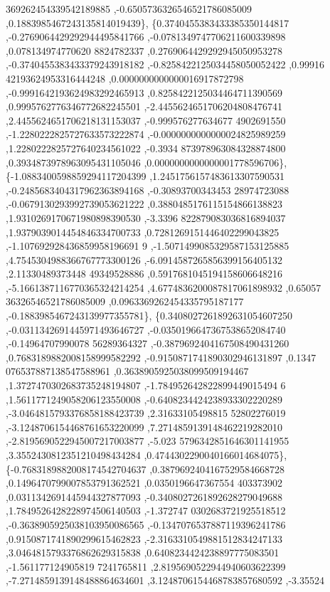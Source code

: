 \begin{DoxyCode}
      369262454339542189885 ,-0.6505736326546521786085009 ,0.1883985467243135814019439\},
\{0.3740455383433385350144817 ,-0.2769064429292944495841766 ,-0.0781349747706211600339898 ,0.078134974770620
      8824782337 ,0.2769064429292945050953278 ,-0.3740455383433379243918182 ,-0.8258422125034458050052422 ,0.99916
      42193624953316444248 ,0.0000000000000016917872798 ,-0.9991642193624983292465913 ,0.8258422125034464711390569
       ,0.9995762776346772682245501 ,-2.4455624651706204808476741 ,2.4455624651706218131153037 ,-0.999576277634677
      4902691550 ,-1.2280222825727633573222874 ,-0.0000000000000024825989259 ,1.2280222825727640234561022 ,-0.3934
      873978963084328874800 ,0.3934873978963095431105046 ,0.0000000000000001778596706\},
\{-1.0883400598859294117204399 ,1.2451756157483613307590531 ,-0.2485683404317962363894168 ,-0.30893700343453
      28974723088 ,-0.0679130293992739053621222 ,0.3880485176115154866138823 ,1.9310269170671980898390530 ,-3.3396
      822879083036816894037 ,1.9379039014454846334700733 ,0.7281269151446402299043825 ,-1.107692928436859958196691
      9 ,-1.5071499085329587153125885 ,4.7545304988366767773300126 ,-6.0914587265856399156405132 ,2.11330489373448
      49349528886 ,0.5917681045194158606648216 ,-5.1661387116770365324214254 ,4.6774836200087817061898932 ,0.65057
      36326546521786085009 ,0.0963369262454335795187177 ,-0.1883985467243139977355781\},
\{0.3408027261892631054607250 ,-0.0311342691445971493646727 ,-0.0350196647367538652084740 ,-0.14964707990078
      56289364327 ,-0.3879692404167508490431260 ,0.7683189882008158999582292 ,-0.9150871741890302946131897 ,0.1347
      076537887138547588961 ,0.3638905925038099509194467 ,1.3727470302683735248194807 ,-1.784952642822899449015494
      6 ,1.5611771249058206123550008 ,-0.6408234424238933302220289 ,-3.0464815793376858188423739 ,2.31633105498815
      52802276019 ,-3.1248706154468761653220099 ,7.2714859139148462219282010 ,-2.8195690522945007217003877 ,-5.023
      5796342851646301141955 ,3.3552430812351210498434284 ,0.4744302290040166014684075\},
\{-0.7683189882008174542704637 ,0.3879692404167529584668728 ,0.1496470799007853791362521 ,0.0350196647367554
      403373902 ,0.0311342691445944327877093 ,-0.3408027261892628279049688 ,1.7849526428228974506140503 ,-1.372747
      0302683721925518512 ,-0.3638905925038103950086565 ,-0.1347076537887119396241786 ,0.9150871741890299615462823
       ,-2.3163310549881512834247133 ,3.0464815793376862629315838 ,0.6408234424238897775083501 ,-1.561177124905819
      7241765811 ,2.8195690522944940603622399 ,-7.2714859139148488864634601 ,3.1248706154468783857680592 ,-3.35524

\end{DoxyCode}
